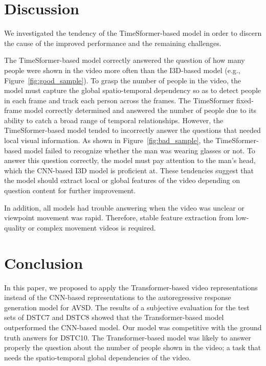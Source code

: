 \documentclass[letterpaper]{article} %
\begin{document}
\section{Discussion}
% 
We investigated the tendency of the TimeSformer-based model in order to discern the cause of the improved performance and the remaining challenges.

The TimeSformer-based model correctly answered the question of how many people were shown in the video more often than the I3D-based model (e.g., Figure~\ref{fig:good_sample}).
% 
To grasp the number of people in the video, the model must capture the global spatio-temporal dependency so as to detect people in each frame and track each person across the frames.
The TimeSformer fixed-frame model correctly determined and answered the number of people due to its ability to catch a broad range of temporal relationships.
% 
% 
However, the TimeSformer-based model tended to incorrectly answer the questions that needed local visual information.
As shown in Figure~\ref{fig:bad_sample}, the TimeSformer-based model failed to recognize whether the man was wearing glasses or not. 
To answer this question correctly, the model must pay attention to the man's head, which the CNN-based I3D model is proficient at.
% 
These tendencies suggest that the model should extract local or global features of the video depending on question content for further improvement.

% 
In addition, all models had trouble answering when the video was unclear or viewpoint movement was rapid.
%
Therefore, stable feature extraction from low-quality or complex movement videos is required.

\section{Conclusion}
In this paper, we proposed to apply the Transformer-based video representations instead of the CNN-based representations to the autoregressive response generation model for AVSD.
The results of a subjective evaluation for the test sets of DSTC7 and DSTC8 showed that the Transformer-based model outperformed the CNN-based model.
Our model was competitive with the ground truth answers for DSTC10.
The Transformer-based model was likely to answer properly the question about the number of people shown in the video; a task that needs the spatio-temporal global dependencies of the video.
\end{document}
